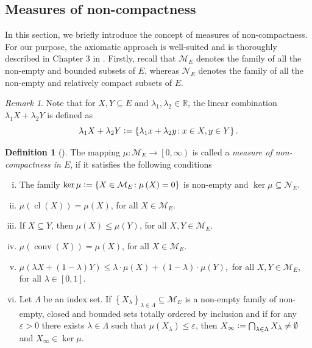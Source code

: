 \documentclass[reqno]{amsart}
\numberwithin{equation}{section}
\theoremstyle{definition}
\newtheorem{definition}{Definition}
\theoremstyle{remark}
\newtheorem{remark}{Remark}
\newcommand{\br}[1]{\left(#1\right)}
\newcommand{\cbr}[1]{\left\{#1\right\}}
\newcommand{\cl}[1]{\clOperator\br{#1}}
\newcommand{\conv}[1]{\convOperator\br{#1}}
\newcommand{\defeq}{\vcentcolon=}
\newcommand{\eps}{\varepsilon}
\newcommand{\fM}{\mathcal{M}}
\newcommand{\fN}{\mathcal{N}}
\newcommand{\lsrbr}[1]{\left[#1\right)}
\newcommand{\R}{\mathbb{R}}
\newcommand{\sbr}[1]{\left[#1\right]}
\newcommand{\st}{\!:}
\DeclareMathOperator{\clOperator}{cl}
\DeclareMathOperator{\convOperator}{conv}
\begin{document}
	\subsection{Measures of non-compactness}\label{sec_02_06}
	In this section, we briefly introduce the concept of measures of non-compactness. For our purpose, the axiomatic approach is well-suited and is thoroughly described in Chapter $3$ in \cite{Banas_book}. Firstly, recall that $\fM_E$ denotes the family of all the non-empty and bounded subsets of $E$, whereas $\fN_E$ denotes the family of all the non-empty and relatively compact subsets of $E$.
	\begin{remark}
		Note that for $X,Y\subseteq{E}$ and $\lambda_1,\lambda_2\in\R$, the linear combination $\lambda_1{X}+\lambda_2{Y}$ is defined as
		\begin{equation*}
			\lambda_1{X}+\lambda_2{Y}\defeq\cbr{\lambda_1{x}+\lambda_2{y}\st{x}\in{X},y\in{Y}}.
		\end{equation*}
	\end{remark}
	\begin{definition}[]\label{def_04}
		The mapping $\mu\st\fM_E\rightarrow\lsrbr{0,\infty}$ is called a \textit{measure of non-compactness in $E$}, if it satisfies the following conditions
		\begin{enumerate}[(i)]
			\item The family $\ker\mu\defeq\cbr{X\in\fM_E\st\mu\br{X}=0}$ is non-empty and $\ker\mu\subseteq\fN_E$.\label{def_04_ax_01}
			\item $\mu\br{\cl{X}}=\mu\br{X}$, for all $X\in\fM_E$.
			\item If $X\subseteq{Y}$, then $\mu\br{X}\leq\mu\br{Y}$, for all $X,Y\in\fM_E$.\label{def_04_ax_03}
			\item $\mu\br{\conv{X}}=\mu\br{X}$, for all $X\in\fM_E$.
			\item $\mu\br{\lambda{X}+\br{1-\lambda}Y}\leq\lambda\cdot\mu\br{X}+\br{1-\lambda}\cdot\mu\br{Y}$,\, for all $X,Y\in\fM_E$,\, for all $\lambda\in\sbr{0,1}$.
			\item Let $\Lambda$ be an index set. If $\cbr{X_{\lambda}}_{\lambda\in\Lambda}\subseteq\fM_E$ is a non-empty family of non-empty, closed and bounded sets totally ordered by inclusion and if for any $\eps>0$ there exists $\lambda\in\Lambda$ such that $\mu\br{X_{\lambda}}\leq\eps$, then $X_{\infty}\defeq\bigcap_{\lambda\in\Lambda}X_{\lambda}\neq\emptyset$ and $X_{\infty}\in\ker\mu$.\label{def_04_ax_06}
		\end{enumerate}
	\end{definition}
\end{document}
